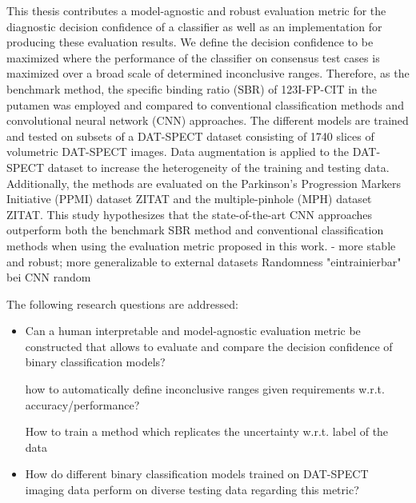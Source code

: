 This thesis contributes a model-agnostic and robust evaluation metric for the diagnostic decision confidence of a classifier 
as well as an implementation for producing these evaluation results.
We define the decision confidence to be maximized where the performance of the classifier on consensus test cases 
is maximized over a broad scale of determined inconclusive ranges.
Therefore, as the benchmark method, the specific binding ratio (SBR) of 123I-FP-CIT in the putamen was employed and 
compared to conventional classification methods and convolutional neural network (CNN) approaches.
The different models are trained and tested on subsets of a DAT-SPECT dataset consisting of 1740 slices of 
volumetric DAT-SPECT images.
Data augmentation is applied to the DAT-SPECT dataset to increase the heterogeneity of the training and testing data.
Additionally, the methods are evaluated on the Parkinson's Progression Markers Initiative (PPMI) dataset ZITAT and 
the multiple-pinhole (MPH) dataset ZITAT.
This study hypothesizes that the state-of-the-art CNN approaches outperform both the benchmark SBR method and conventional 
classification methods when using the evaluation metric proposed in this work.
- more stable and robust; more generalizable to external datasets
Randomness "eintrainierbar" bei CNN random

The following research questions are addressed: 
\begin{itemize}
    \item Can a human interpretable and model-agnostic evaluation metric be constructed that allows 
    to evaluate and compare the decision confidence of binary classification models?

    how to automatically define inconclusive ranges given requirements w.r.t. accuracy/performance?

    How to train a method which replicates the uncertainty w.r.t. label of the data

    \item How do different binary classification models trained on DAT-SPECT imaging data perform on 
    diverse testing data regarding this metric? 

\end{itemize}




